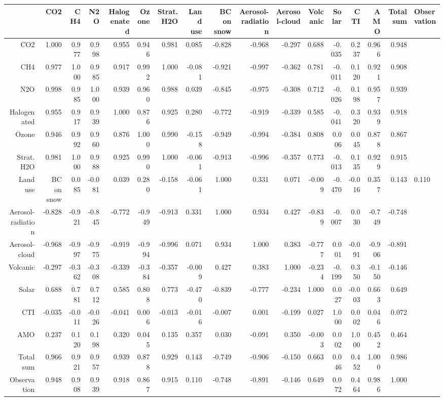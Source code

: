 \begin{table}[ht]
\centering
\begin{tabular}{rrrrrrrrrrrrrrrr}
  \hline
 & CO2 & CH4 & N2O & Halogenated & Ozone & Strat. H2O & Land use & BC on snow & Aerosol-radiation & Aerosol-cloud & Volcanic & Solar & CTI & AMO & Total sum & Observation \\ 
  \hline
CO2 & 1.000 & 0.977 & 0.998 & 0.955 & 0.946 & 0.981 & 0.085 & -0.828 & -0.968 & -0.297 & 0.688 & -0.035 & 0.237 & 0.966 & 0.948 \\ 
  CH4 & 0.977 & 1.000 & 0.985 & 0.917 & 0.992 & 1.000 & -0.081 & -0.921 & -0.997 & -0.362 & 0.781 & -0.011 & 0.120 & 0.921 & 0.908 \\ 
  N2O & 0.998 & 0.985 & 1.000 & 0.939 & 0.960 & 0.988 & 0.039 & -0.845 & -0.975 & -0.308 & 0.712 & -0.026 & 0.198 & 0.957 & 0.939 \\ 
  Halogenated & 0.955 & 0.917 & 0.939 & 1.000 & 0.876 & 0.925 & 0.280 & -0.772 & -0.919 & -0.339 & 0.585 & -0.041 & 0.320 & 0.939 & 0.918 \\ 
  Ozone & 0.946 & 0.992 & 0.960 & 0.876 & 1.000 & 0.990 & -0.158 & -0.949 & -0.994 & -0.384 & 0.808 & 0.006 & 0.045 & 0.878 & 0.867 \\ 
  Strat. H2O & 0.981 & 1.000 & 0.988 & 0.925 & 0.990 & 1.000 & -0.061 & -0.913 & -0.996 & -0.357 & 0.773 & -0.013 & 0.135 & 0.929 & 0.915 \\ 
  Land use & BC on snow & 0.085 & -0.081 & 0.039 & 0.280 & -0.158 & -0.061 & 1.000 & 0.331 & 0.071 & -0.009 & -0.470 & -0.016 & 0.357 & 0.143 & 0.110 \\ 
  Aerosol-radiation & -0.828 & -0.921 & -0.845 & -0.772 & -0.949 & -0.913 & 0.331 & 1.000 & 0.934 & 0.427 & -0.839 & -0.007 & 0.030 & -0.749 & -0.748 \\ 
  Aerosol-cloud & -0.968 & -0.997 & -0.975 & -0.919 & -0.994 & -0.996 & 0.071 & 0.934 & 1.000 & 0.383 & -0.777 & 0.001 & -0.091 & -0.906 & -0.891 \\ 
  Volcanic & -0.297 & -0.362 & -0.308 & -0.339 & -0.384 & -0.357 & -0.009 & 0.427 & 0.383 & 1.000 & -0.234 & -0.199 & 0.350 & -0.150 & -0.146 \\ 
  Solar & 0.688 & 0.781 & 0.712 & 0.585 & 0.808 & 0.773 & -0.470 & -0.839 & -0.777 & -0.234 & 1.000 & 0.027 & -0.003 & 0.663 & 0.649 \\ 
  CTI & -0.035 & -0.011 & -0.026 & -0.041 & 0.006 & -0.013 & -0.016 & -0.007 & 0.001 & -0.199 & 0.027 & 1.000 & 0.002 & 0.046 & 0.072 \\ 
  AMO & 0.237 & 0.120 & 0.198 & 0.320 & 0.045 & 0.135 & 0.357 & 0.030 & -0.091 & 0.350 & -0.003 & 0.002 & 1.000 & 0.452 & 0.464 \\ 
  Total sum & 0.966 & 0.921 & 0.957 & 0.939 & 0.878 & 0.929 & 0.143 & -0.749 & -0.906 & -0.150 & 0.663 & 0.046 & 0.452 & 1.000 & 0.986 \\ 
  Observation & 0.948 & 0.908 & 0.939 & 0.918 & 0.867 & 0.915 & 0.110 & -0.748 & -0.891 & -0.146 & 0.649 & 0.072 & 0.464 & 0.986 & 1.000 \\ 
   \hline
\end{tabular}
\end{table}
